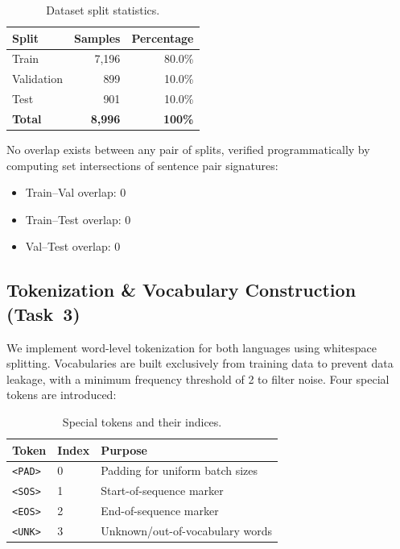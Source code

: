 \documentclass[runningheads]{llncs}
\begin{document}
\begin{table}[H]
\centering
\caption{Dataset split statistics.}
\label{tab:dataset_split}
\begin{tabular}{@{}lrr@{}}
\toprule
\textbf{Split} & \textbf{Samples} & \textbf{Percentage} \\
\midrule
Train      & 7,196 & 80.0\% \\
Validation & 899   & 10.0\% \\
Test       & 901   & 10.0\% \\
\midrule
\textbf{Total} & \textbf{8,996} & \textbf{100\%} \\
\bottomrule
\end{tabular}
\end{table}

No overlap exists between any pair of splits, verified programmatically by computing set intersections of sentence pair signatures:
\begin{itemize}
    \item Train--Val overlap: 0
    \item Train--Test overlap: 0
    \item Val--Test overlap: 0
\end{itemize}

\subsection{Tokenization \& Vocabulary Construction (Task~3)}

We implement word-level tokenization for both languages using whitespace splitting. Vocabularies are built exclusively from training data to prevent data leakage, with a minimum frequency threshold of 2 to filter noise. Four special tokens are introduced:

\begin{table}[H]
\centering
\caption{Special tokens and their indices.}
\begin{tabular}{@{}lll@{}}
\toprule
\textbf{Token} & \textbf{Index} & \textbf{Purpose} \\
\midrule
\texttt{<PAD>} & 0 & Padding for uniform batch sizes \\
\texttt{<SOS>} & 1 & Start-of-sequence marker \\
\texttt{<EOS>} & 2 & End-of-sequence marker \\
\texttt{<UNK>} & 3 & Unknown/out-of-vocabulary words \\
\bottomrule
\end{tabular}
\end{table}
\end{document}
